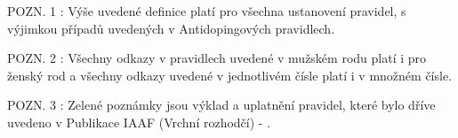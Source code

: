 POZN. 1 : Výše uvedené definice platí pro všechna ustanovení pravidel, s výjimkou případů uvedených v Antidopingových pravidlech.

POZN. 2 : Všechny odkazy v pravidlech uvedené v mužském rodu platí i pro ženský rod a všechny odkazy uvedené v jednotlivém čísle platí i v množném čísle.

POZN. 3 : Zelené poznámky jsou výklad a uplatnění pravidel, které bylo dříve uvedeno v Publikace IAAF  (Vrchní rozhodčí) - .







\bye